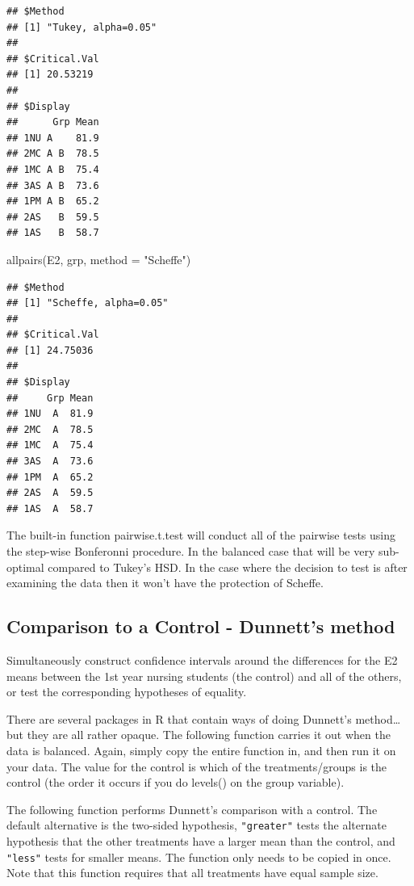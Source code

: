 \documentclass[
]{book}
\newenvironment{Shaded}{\begin{snugshade}}{\end{snugshade}}
\newcommand{\AttributeTok}[1]{\textcolor[rgb]{0.77,0.63,0.00}{#1}}
\newcommand{\FunctionTok}[1]{\textcolor[rgb]{0.00,0.00,0.00}{#1}}
\newcommand{\NormalTok}[1]{#1}
\newcommand{\StringTok}[1]{\textcolor[rgb]{0.31,0.60,0.02}{#1}}
\begin{document}
\begin{verbatim}
## $Method
## [1] "Tukey, alpha=0.05"
## 
## $Critical.Val
## [1] 20.53219
## 
## $Display
##      Grp Mean
## 1NU A    81.9
## 2MC A B  78.5
## 1MC A B  75.4
## 3AS A B  73.6
## 1PM A B  65.2
## 2AS   B  59.5
## 1AS   B  58.7
\end{verbatim}

\begin{Shaded}
\begin{Highlighting}[]
\FunctionTok{allpairs}\NormalTok{(E2, grp, }\AttributeTok{method =} \StringTok{"Scheffe"}\NormalTok{)}
\end{Highlighting}
\end{Shaded}

\begin{verbatim}
## $Method
## [1] "Scheffe, alpha=0.05"
## 
## $Critical.Val
## [1] 24.75036
## 
## $Display
##     Grp Mean
## 1NU  A  81.9
## 2MC  A  78.5
## 1MC  A  75.4
## 3AS  A  73.6
## 1PM  A  65.2
## 2AS  A  59.5
## 1AS  A  58.7
\end{verbatim}

The built-in function pairwise.t.test will conduct all of the pairwise tests using the step-wise Bonferonni procedure. In the balanced case that will be very sub-optimal compared to Tukey's HSD. In the case where the decision to test is after examining the data then it won't have the protection of Scheffe.

\hypertarget{comparison-to-a-control---dunnetts-method}{%
\subsection{Comparison to a Control - Dunnett's method}\label{comparison-to-a-control---dunnetts-method}}

Simultaneously construct confidence intervals around the differences for the E2 means between the 1st year nursing students (the control) and all of the others, or test the corresponding hypotheses of equality.

There are several packages in R that contain ways of doing Dunnett's method\ldots{} but they are all rather opaque. The following function carries it out when the data is balanced. Again, simply copy the entire function in, and then run it on your data. The value for the control is which of the treatments/groups is the control (the order it occurs if you do levels() on the group variable).

The following function performs Dunnett's comparison with a control. The default alternative is the two-sided hypothesis, \texttt{"greater"} tests the alternate hypothesis that the other treatments have a larger mean than the control, and \texttt{"less"} tests for smaller means. The function only needs to be copied in once. Note that this function requires that all treatments have equal sample size.
\end{document}
